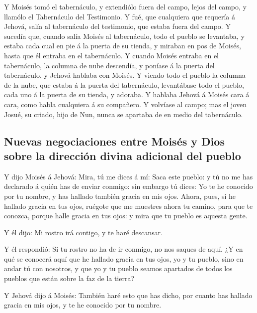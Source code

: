  Y Moisés tomó el tabernáculo, y extendiólo fuera del
campo, lejos del campo, y llamólo el Tabernáculo del Testimonio. Y fué,
que cualquiera que requería á Jehová, salía al tabernáculo del
testimonio, que estaba fuera del campo.  Y sucedía que,
cuando salía Moisés al tabernáculo, todo el pueblo se levantaba, y
estaba cada cual en pie á la puerta de su tienda, y miraban en pos de
Moisés, hasta que él entraba en el tabernáculo.  Y cuando
Moisés entraba en el tabernáculo, la columna de nube descendía, y
poníase á la puerta del tabernáculo, y Jehová hablaba con Moisés.
 Y viendo todo el pueblo la columna de la nube, que
estaba á la puerta del tabernáculo, levantábase todo el pueblo, cada uno
á la puerta de su tienda, y adoraba.  Y hablaba Jehová á
Moisés cara á cara, como habla cualquiera á su compañero. Y volvíase al
campo; mas el joven Josué, su criado, hijo de Nun, nunca se apartaba de
en medio del tabernáculo.

\hypertarget{nuevas-negociaciones-entre-moisuxe9s-y-dios-sobre-la-direcciuxf3n-divina-adicional-del-pueblo}{%
\subsection{Nuevas negociaciones entre Moisés y Dios sobre la dirección
divina adicional del
pueblo}\label{nuevas-negociaciones-entre-moisuxe9s-y-dios-sobre-la-direcciuxf3n-divina-adicional-del-pueblo}}

 Y dijo Moisés á Jehová: Mira, tú me dices á mí: Saca
este pueblo: y tú no me has declarado á quién has de enviar conmigo: sin
embargo tú dices: Yo te he conocido por tu nombre, y has hallado también
gracia en mis ojos.  Ahora, pues, si he hallado gracia en
tus ojos, ruégote que me muestres ahora tu camino, para que te conozca,
porque halle gracia en tus ojos: y mira que tu pueblo es aquesta gente.

 Y él dijo: Mi rostro irá contigo, y te haré descansar.

 Y él respondió: Si tu rostro no ha de ir conmigo, no nos
saques de aquí.  ¿Y en qué se conocerá aquí que he
hallado gracia en tus ojos, yo y tu pueblo, sino en andar tú con
nosotros, y que yo y tu pueblo seamos apartados de todos los pueblos que
están sobre la faz de la tierra?

 Y Jehová dijo á Moisés: También haré esto que has dicho,
por cuanto has hallado gracia en mis ojos, y te he conocido por tu
nombre.

